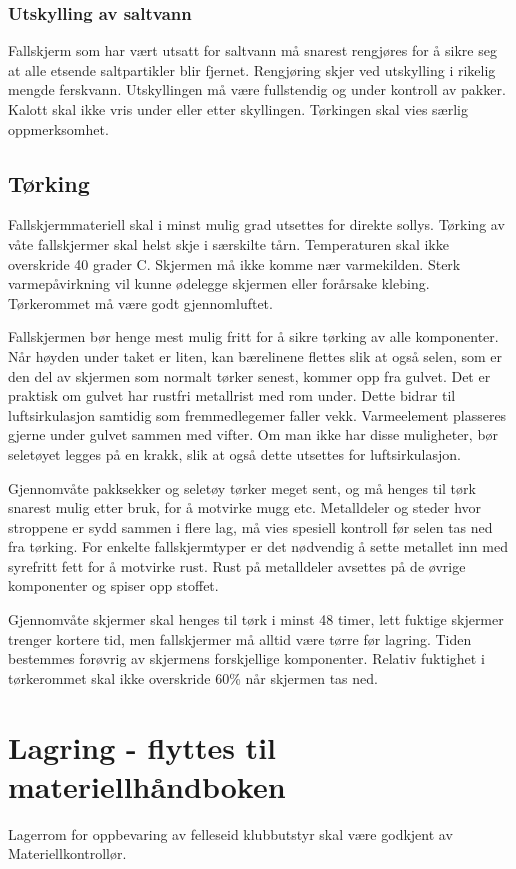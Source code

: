 \subsubsection{Utskylling av saltvann}
Fallskjerm som har vært utsatt for saltvann må snarest rengjøres for å sikre seg at alle etsende saltpartikler blir fjernet. Rengjøring skjer ved utskylling i rikelig mengde ferskvann. Utskyllingen må være fullstendig og under kontroll av pakker. Kalott skal ikke vris under eller etter skyllingen. Tørkingen skal vies særlig oppmerksomhet.

\subsection{Tørking}
Fallskjermmateriell skal i minst mulig grad utsettes for direkte sollys. Tørking av våte fallskjermer skal helst skje i særskilte tårn. Temperaturen skal ikke overskride 40 grader C. Skjermen må ikke komme nær varmekilden. Sterk varmepåvirkning vil kunne ødelegge skjermen eller forårsake klebing. Tørkerommet må være godt gjennomluftet.

Fallskjermen bør henge mest mulig fritt for å sikre tørking av alle komponenter. Når høyden under taket er liten, kan bærelinene flettes slik at også selen, som er den del av skjermen som normalt tørker senest, kommer opp fra gulvet. Det er praktisk om gulvet har rustfri metallrist med rom under. Dette bidrar til luftsirkulasjon samtidig som fremmedlegemer faller vekk. Varmeelement plasseres gjerne under gulvet sammen med vifter. Om man ikke har disse muligheter, bør seletøyet legges på en krakk, slik at også dette utsettes for luftsirkulasjon.

Gjennomvåte pakksekker og seletøy tørker meget sent, og må henges til tørk snarest mulig etter bruk, for å motvirke mugg etc. Metalldeler og steder hvor stroppene er sydd sammen i flere lag, må vies spesiell kontroll før selen tas ned fra tørking. For enkelte fallskjermtyper er det nødvendig å sette metallet inn med syrefritt fett for å motvirke rust. Rust på metalldeler avsettes på de øvrige komponenter og spiser opp stoffet.

Gjennomvåte skjermer skal henges til tørk i minst 48 timer, lett fuktige skjermer trenger kortere tid, men fallskjermer må alltid være tørre før lagring. Tiden bestemmes forøvrig av skjermens forskjellige komponenter. Relativ fuktighet i tørkerommet skal ikke overskride 60\% når skjermen tas ned.

\section[Lagring]{Lagring - flyttes til materiellhåndboken}
Lagerrom for oppbevaring av felleseid klubbutstyr skal være godkjent av Materiellkontrollør.

